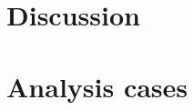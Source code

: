 \section{Discussion}\label{sec:discussion}
\section{Analysis cases}\label{sec:experiments-discussion}